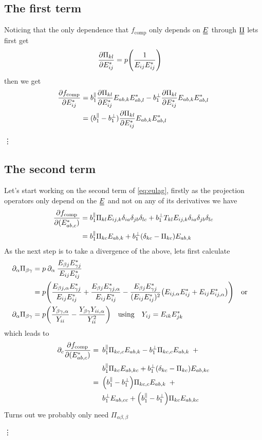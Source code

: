 \documentclass{article}
\newcommand\barbelow[1]{\stackunder[1.2pt]{$#1$}{\rule{1.5ex}{.1ex}}}
\newcommand{\du}[1]{\barbelow{\barbelow{#1}}}
\newcommand{\pp}{\partial}
\newcommand{\YY}[3][j]{E_{#2#1}E_{#3#1}^*}
\begin{document}
\subsection{The first term}
Noticing that the only dependence that $f_\text{comp}$ only depends on $\du{E}$ through $\du{\Pi}$ lets first get
\begin{align}
    \pdv{\Pi_{kl}}{E_{ij}^*} &= p \qty(\frac{1}{\YY{i}{i}})
\end{align}
then we get
\begin{align}
    \pdv{f_\text{comp}}{E_{ij}^*} &= b_1^\parallel \pdv{\Pi_{kl}}{E_{ij}^*}E_{ab,k}E_{ab,l}^* - b_1^\perp \pdv{\Pi_{kl}}{E_{ij}^*}E_{ab,k}E_{ab,l}^* \\
    &= (b_1^\parallel - b_1^\perp) \pdv{\Pi_{kl}}{E_{ij}^*}E_{ab,k}E_{ab,l}^*
\end{align}

\vdots

\subsection{The second term}
Let's start working on the second term of \cref{eq:eulag}, firstly as the projection operators only depend on the $\du{E}$ and not on any of its derivatives we have
\begin{align}
    \pdv{f_\text{comp}}{(E_{ab,c}^*)} &= b_1^\parallel \Pi_{kl} E_{ij,k}\delta_{ia}\delta_{jb}\delta_{lc} + b_1^\perp T_{kl} E_{ij,k}\delta_{ia}\delta_{jb}\delta_{lc} \\
    &= b_1^\parallel \Pi_{kc} E_{ab,k} + b_1^\perp \qty(\delta_{kc} - \Pi_{kc}) E_{ab,k}
\end{align}
As the next step is to take a divergence of the above, lets first calculate
\begin{align}
    \pp_\alpha \Pi_{\beta\gamma} &= p \mathbin{\pp_\alpha} \frac{E_{\beta j}E_{\gamma j}^*}{E_{ij}E_{ij}^*} \\
    &= p \qty(\frac{E_{\beta j, \alpha}E_{\gamma j}^*}{E_{ij}E_{ij}^*} + \frac{E_{\beta j}E_{\gamma j, \alpha}^*}{E_{ij}E_{ij}^*} - \frac{E_{\beta j}E_{\gamma j}^*}{(E_{ij}E_{ij}^*)^2}\qty(E_{ij,\alpha}E_{ij}^* + E_{ij}E_{ij,\alpha}^*) ) && \text{or} \\
    \pp_\alpha \Pi_{\beta\gamma} &= p \qty(\frac{Y_{\beta\gamma,\alpha}}{Y_{ii}} - \frac{Y_{\beta\gamma} Y_{ii,\alpha}}{Y_{ii}^2}) \qq{using} Y_{ij} = E_{ik}E_{jk}^*
\end{align}
which leads to
\begin{align}
    \pp_c \pdv{f_\text{comp}}{(E_{ab,c}^*)} =\enspace& b_1^\parallel \Pi_{kc,c} E_{ab,k} - b_1^\perp \Pi_{kc,c} E_{ab,k} \enspace+ \\
    & b_1^\parallel \Pi_{kc} E_{ab,kc} + b_1^\perp \qty(\delta_{kc} - \Pi_{kc}) E_{ab,kc} \\
    =\enspace& \qty(b_1^\parallel - b_1^\perp) \Pi_{kc,c} E_{ab,k} \enspace+ \\
    & b_1^\perp E_{ab,cc} + \qty(b_1^\parallel - b_1^\perp) \Pi_{kc} E_{ab,kc}
\end{align}
Turns out we probably only need $\Pi_{\alpha\beta,\beta}$

\vdots
\end{document}
